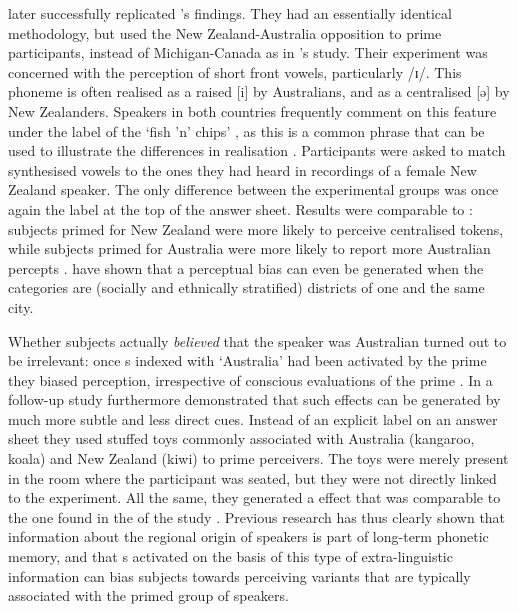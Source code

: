 \textcite{hayetal2006a} later successfully replicated \citeauthor{niedzielski1999}'s findings.
They had an essentially identical methodology, but used the New Zealand-Australia opposition to prime participants, instead of Michigan-Canada as in \citeauthor{niedzielski1999}'s study.
Their experiment was concerned with the perception of short front vowels, particularly /ɪ/.
This phoneme is often realised as a raised [i] by Australians, and as a centralised [ə] by New Zealanders.
Speakers in both countries frequently comment on this feature under the label of the `fish 'n' chips' , as this is a common phrase that can be used to illustrate the differences in realisation \parencite[cf.][354]{hayetal2006a}.
Participants were asked to match synthesised vowels to the ones they had heard in recordings of a female New Zealand speaker.
The only difference between the experimental groups was once again the label at the top of the answer sheet.
Results were comparable to \citealt{niedzielski1999}: subjects primed for New Zealand were more likely to perceive centralised tokens, while subjects primed for Australia were more likely to report more Australian percepts \parencite[cf.][359--363]{hayetal2006a}.
\textcite{jannedyetal2011} have shown that a perceptual bias can even be generated when the  categories are (socially and ethnically stratified) districts of one and the same city.

Whether subjects actually \emph{believed} that the speaker was Australian turned out to be irrelevant: once s indexed with `Australia' had been activated by the prime they biased perception, irrespective of conscious evaluations of the prime \parencite[cf.][374]{hayetal2006a}.
In a follow-up study \textcite{haydrager2010} furthermore demonstrated that such  effects can be generated by much more subtle and less direct cues.
Instead of an explicit label on an answer sheet they used stuffed toys commonly associated with Australia (kangaroo, koala) and New Zealand (kiwi) to prime perceivers.
The toys were merely present in the room where the participant was seated, but they were not directly linked to the experiment.
All the same, they generated a  effect that was comparable to the one found in the  of the \citeauthor{niedzielski1999} study \parencite[cf.][871--872 and 874--875]{haydrager2010}.
Previous research has thus clearly shown that information about the regional origin of speakers is part of long-term phonetic memory, and that s activated on the basis of this type of extra-linguistic information can bias subjects towards perceiving variants that are typically associated with the primed group of speakers.

